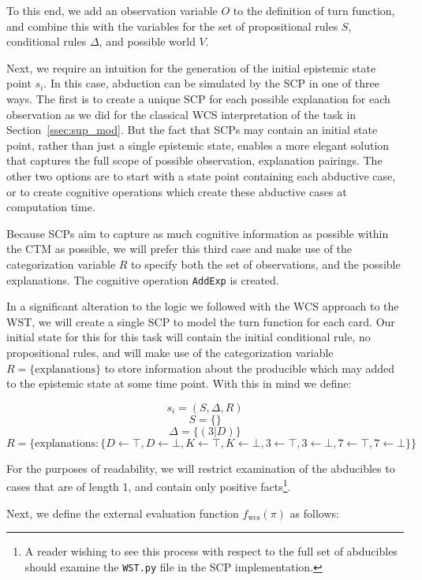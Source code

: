 To this end, we add an observation variable $O$ to the definition of turn function, and combine this with the variables for the set of propositional rules $S$, conditional rules $\Delta$, and possible world $V$.

Next, we require an intuition for the generation of the initial epistemic state point $s_i$. In this case, abduction can be simulated by the SCP in one of three ways. The first is to create a unique SCP for each possible explanation for each observation as we did for the classical WCS interpretation of the task in Section~\ref{ssec:sup_mod}. But the fact that SCPs may contain an initial state point, rather than just a single epistemic state, enables a more elegant solution that captures the full scope of possible observation, explanation pairings. The other two options are to start with a state point containing each abductive case, or to create cognitive operations which create these abductive cases at computation time.

Because SCPs aim to capture as much cognitive information as possible within the CTM as possible, we will prefer this third case and make use of the categorization variable $R$ to specify both the set of observations, and the possible explanations. The cognitive operation \texttt{AddExp} is created.

In a significant alteration to the logic we followed with the WCS approach to the WST, we will create a single SCP to model the turn function for each card. Our initial state for this for this task will contain the initial conditional rule, no propositional rules, and will make use of the categorization variable $R=\{\text{explanations}\}$ to store information about the producible which may added to the epistemic state at some time point. With this in mind we define:

\[
s_i=(S,\Delta, R)
\]
\[
S=\{\}
\]
\[
\Delta=\{(3|D)\}
\]
\[
R=\{\text{explanations}:\{D\leftarrow \top, D \leftarrow \bot, K\leftarrow \top, K \leftarrow \bot, 3\leftarrow \top, 3 \leftarrow \bot, 7\leftarrow \top, 7\leftarrow \bot\}\}
\]

For the purposes of readability, we will restrict examination of the abducibles to cases that are of length 1, and contain only positive facts\footnote{A reader wishing to see this process with respect to the full set of abducibles should examine the \texttt{WST.py} file in the SCP implementation.}.

Next, we define the external evaluation function $f_\text{wcs}(\pi)$ as follows:

